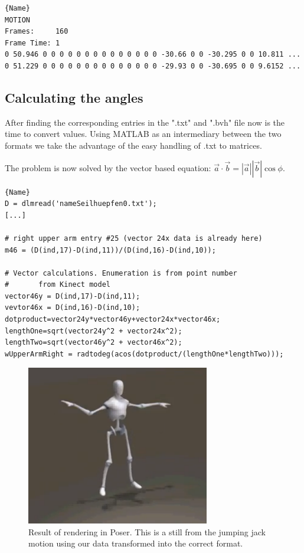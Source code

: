 \documentclass[a4paper]{article}
\begin{document}
\begin{lstlisting}[caption=Motionpart of .bvh. TODO: MORE TEXT!]{Name}
MOTION
Frames:     160
Frame Time: 1                
0 50.946 0 0 0 0 0 0 0 0 0 0 0 0 0 0 -30.66 0 0 -30.295 0 0 10.811 ...
0 51.229 0 0 0 0 0 0 0 0 0 0 0 0 0 0 -29.93 0 0 -30.695 0 0 9.6152 ...
\end{lstlisting}

\subsection{Calculating the angles}

After finding the corresponding entries in the ".txt" and ".bvh" file now is the time to convert values.
Using MATLAB as an intermediary between the two formats we take the advantage of the easy handling of .txt to matrices.

The problem is now solved by the vector based equation: $\vec a \cdot \vec b = \left|\vec a \right| \left|\vec b \right| \cos \phi$.

\begin{lstlisting}[caption=Calculating the angle. TODO: MORE TEXT!]{Name}
D = dlmread('nameSeilhuepfen0.txt');
[...]

# right upper arm entry #25 (vector 24x data is already here)
m46 = (D(ind,17)-D(ind,11))/(D(ind,16)-D(ind,10));

# Vector calculations. Enumeration is from point number
#       from Kinect model
vector46y = D(ind,17)-D(ind,11);
vevtor46x = D(ind,16)-D(ind,10);
dotproduct=vector24y*vector46y+vector24x*vector46x;
lengthOne=sqrt(vector24y^2 + vector24x^2);
lengthTwo=sqrt(vector46y^2 + vector46x^2); 
wUpperArmRight = radtodeg(acos(dotproduct/(lengthOne*lengthTwo)));
\end{lstlisting}

\begin{figure}
	\centering
	\includegraphics[width=8cm]{3dRender.PNG}
	\caption{Result of rendering in Poser. This is a still from the jumping jack motion using our data transformed into the correct format.}
	\label{fig:3drender}
\end{figure}

\newpage

\end{document}

